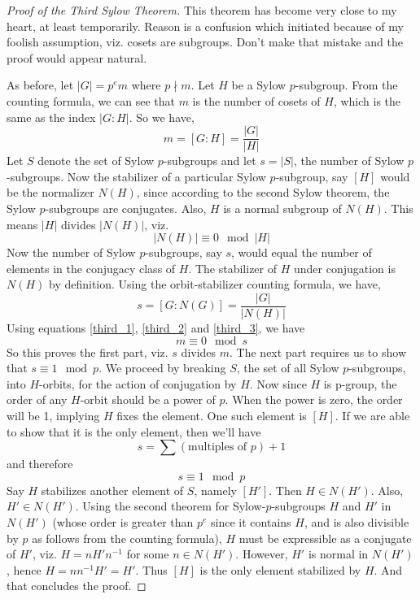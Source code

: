 \documentclass[12pt]{article}
\begin{document}
\begin{proof}[Proof of the Third Sylow Theorem] This theorem has become very close to my heart, at least temporarily. Reason is a confusion which initiated because of my foolish assumption, viz. cosets are subgroups. Don't make that mistake and the proof would appear natural.
\par
As before, let $|G|=p^{e}m$ where $p \nmid m$. Let $H$ be a Sylow $p$-subgroup. From the counting formula, we can see that $m$ is the number of cosets of $H$, which is the same as the index $|G:H|$. So we have,
\begin{equation}
m=[G:H]=\frac{|G|}{|H|}
\label{third_1}
\end{equation}
Let $S$ denote the set of Sylow $p$-subgroups and let $s=|S|$, the number of Sylow $p$-subgroups. Now the stabilizer of a particular Sylow $p$-subgroup, say $[H]$ would be the normalizer $N(H)$, since according to the second Sylow theorem, the Sylow $p$-subgroups are conjugates. Also, $H$ is a normal subgroup of $N(H)$. This means $|H|$ divides $|N(H)|$, viz. 
\begin{equation}
|N(H)| \equiv 0 \mod{|H|}
\label{third_2}
\end{equation}
Now the number of Sylow $p$-subgroups, say $s$, would equal the number of elements in the conjugacy class of $H$. The stabilizer of $H$ under conjugation is $N(H)$ by definition. Using the orbit-stabilizer counting formula, we have,
\begin{equation}
s=[G:N(G)]=\frac{|G|}{|N(H)|}
\label{third_3}
\end{equation}
Using equations \ref{third_1}, \ref{third_2} and \ref{third_3}, we have
\begin{equation*}
m \equiv 0 \mod{s}
\end{equation*}
So this proves the first part, viz. $s$ divides $m$. The next part requires us to show that $s \equiv 1 \mod{p}$. We proceed by breaking $S$, the set of all Sylow $p$-subgroups, into $H$-orbits, for the action of conjugation by $H$. Now since $H$ is p-group, the order of any $H$-orbit should be a power of $p$. When the power is zero, the order will be 1, implying $H$ fixes the element. One such element is $[H]$. If we are able to show that it is the only element, then we'll have
\begin{equation*}
s=\sum (\text {multiples of } p) + 1
\end{equation*}
and therefore
\begin{equation*}
s \equiv 1 \mod{p}
\end{equation*}
Say $H$ stabilizes another element of $S$, namely $[H']$. Then $H \in N(H')$. Also, $H' \in N(H')$. Using the second theorem for Sylow-$p$-subgroups $H$ and $H'$ in $N(H')$ (whose order is greater than $p^{e}$ since it contains $H$, and is also divisible by $p$ as follows from the counting formula), $H$ must be expressible as a conjugate of $H'$, viz. $H=nH'n^{-1}$ for some $n \in N(H')$. However, $H'$ is normal in $N(H')$, hence $H=nn^{-1}H'=H'$. Thus $[H]$ is the only element stabilized by $H$. And that concludes the proof.
\end{proof}
\end{document}
